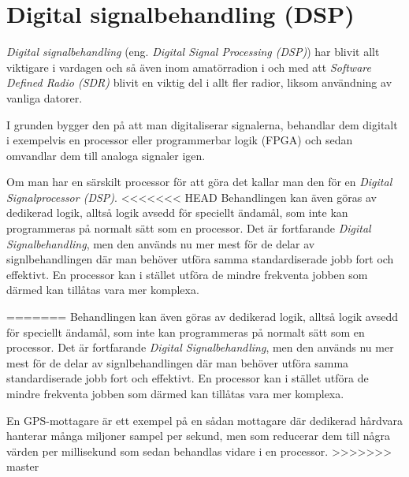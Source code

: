\section{Digital signalbehandling (DSP)}
\label{DSP}

\emph{Digital signalbehandling} (eng. \emph{Digital Signal Processing (DSP)})
har blivit allt viktigare i vardagen och så även inom amatörradion i och med
att \emph{Software Defined Radio (SDR)} blivit en viktig del i allt fler
radior, liksom användning av vanliga datorer.

I grunden bygger den på att man digitaliserar signalerna, behandlar dem
digitalt i exempelvis en processor eller programmerbar logik (FPGA) och sedan
omvandlar dem till analoga signaler igen.

Om man har en särskilt processor för att göra det kallar man den för en
\emph{Digital Signalprocessor (DSP)}.
<<<<<<< HEAD
Behandlingen kan även göras av dedikerad logik, alltså logik avsedd för 
speciellt ändamål, som inte kan programmeras på normalt sätt som en processor. 
Det är fortfarande \emph{Digital Signalbehandling}, men den används nu mer mest 
för de delar av signlbehandlingen där man behöver utföra samma standardiserade 
jobb fort och effektivt. 
En processor kan i stället utföra de mindre frekventa jobben som därmed kan 
tillåtas vara mer komplexa.

=======
Behandlingen kan även göras av dedikerad logik, alltså logik avsedd för speciellt
ändamål, som inte kan programmeras på normalt sätt som en processor. Det är fortfarande
\emph{Digital Signalbehandling}, men den används nu mer mest för de delar av
signlbehandlingen där man behöver utföra samma standardiserade jobb fort och
effektivt.
En processor kan i stället utföra de mindre frekventa jobben som därmed kan
tillåtas vara mer komplexa.

En GPS-mottagare är ett exempel på en sådan mottagare där dedikerad hårdvara
hanterar många miljoner sampel per sekund, men som reducerar dem till några värden
per millisekund som sedan behandlas vidare i en processor.
>>>>>>> master

